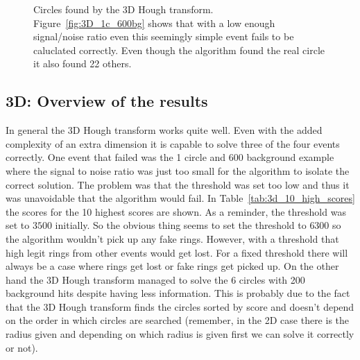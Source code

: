 \documentclass[11pt]{scrreprt}
\begin{document}
\begin{figure}[htp]
        \centering

        \caption[Circles found by the 3D Hough transform]{Circles found by the 3D Hough transform. Figure~\ref{fig:3D_1c_600bg} shows that with a low enough signal/noise ratio even this seemingly simple event fails to be caluclated correctly. Even though the algorithm found the real circle it also found 22 others.\label{fig:3D_HT_results}}
\end{figure}


\subsection{3D: Overview of the results} %
\label{ssub:3d_overview_of_the_results}

In general the 3D Hough transform works quite well. Even with the added complexity of an extra dimension it is capable to solve three of
the four events correctly. One event that failed was the 1 circle and 600 background example where the signal to noise ratio was just 
too small for the algorithm to isolate the correct solution. The problem was that the threshold was set too low and thus it was unavoidable
that the algorithm would fail. In Table~\ref{tab:3d_10_high_scores} the scores for the 10 highest scores are shown. As a reminder, the threshold
was set to $3500$ initially. So the obvious thing seems to set the threshold to $6300$ so the algorithm wouldn't pick up any fake rings.
However, with a threshold that high legit rings from other events would get lost. For a fixed threshold there will always be a case where rings get
lost or fake rings get picked up. 
On the other hand the 3D Hough transform managed to solve the 6 circles with 200 background hits despite having less information. 
This is probably due to the fact that the 3D Hough transform finds the circles sorted by score and doesn't depend on the order in 
which circles are searched (remember, in the 2D case there is the radius given and depending on which radius is given first we can 
solve it correctly or not).
\end{document}
